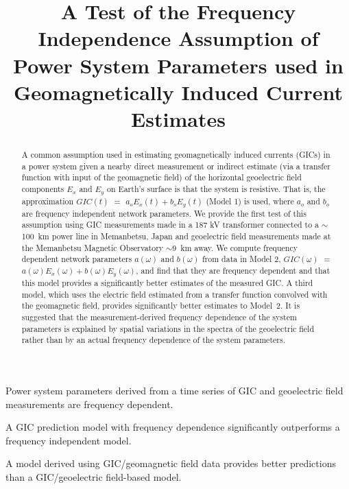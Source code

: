 \documentclass[draft,linenumbers]{agujournal2018}
\begin{document}

\title{A Test of the Frequency Independence Assumption of Power System Parameters used in Geomagnetically Induced Current Estimates}





\begin{keypoints}
\item Power system parameters derived from a time series of GIC and geoelectric field measurements are frequency dependent.
\item A GIC prediction model with frequency dependence significantly outperforms a frequency independent model.
\item A model derived using GIC/geomagnetic field data provides better predictions than a GIC/geoelectric field-based model.
\end{keypoints}

\begin{abstract}
A common assumption used in estimating geomagnetically induced currents (GICs) in a power system given a nearby direct measurement or indirect estimate (via a transfer function with input of the geomagnetic field) of the horizontal geoelectric field components $E_x$ and $E_y$ on Earth's surface is that the system is resistive. That is, the approximation $GIC(t)$  $=$ $a_oE_x(t) + b_oE_y(t)$ (Model 1) is used, where $a_o$ and $b_o$ are frequency independent network parameters.  We provide the first test of this assumption using GIC measurements made in a 187 kV transformer connected to a $\sim$100~km power line in Memanbetsu, Japan and geoelectric field measurements made at the Memanbetsu Magnetic Observatory $\sim$9~km away.  We compute frequency dependent network parameters $a(\omega)$ and $b(\omega)$ from data in Model 2, $GIC(\omega)$ $=$ $a(\omega)E_x(\omega) + b(\omega)E_y(\omega)$, and find that they are frequency dependent and that this model provides a significantly better estimates of the measured GIC. A third model, which uses the electric field estimated from a transfer function convolved with the geomagnetic field, provides significantly better estimates to Model~2. It is suggested that the measurement-derived frequency dependence of the system parameters is explained by spatial variations in the spectra of the geoelectric field rather than by an actual frequency dependence of the system parameters.
\end{abstract}
\end{document}
